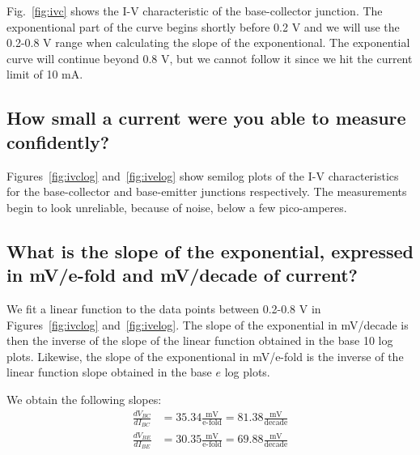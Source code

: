 Fig.~\ref{fig:ivc} shows the I-V characteristic of the base-collector junction. The exponentional part of the curve begins
shortly before 0.2 V and we will use the 0.2-0.8 V range when calculating the slope of the exponentional. The exponential
curve will continue beyond 0.8 V, but we cannot follow it since we hit the current limit of 10 mA.

\subsection{How small a current were you able to measure confidently?}
Figures~\ref{fig:ivclog} and~\ref{fig:ivelog} show semilog plots of the I-V characteristics for the base-collector and
base-emitter junctions respectively. The measurements begin to look unreliable, because of noise, below a few pico-amperes.

\subsection{What is the slope of the exponential, expressed in mV/e-fold and mV/decade of current?}
We fit a linear function to the data points between 0.2-0.8 V in Figures~\ref{fig:ivclog} and~\ref{fig:ivelog}. 
The slope of the exponential in mV/decade is then the inverse of the slope of the linear function obtained in 
the base 10 log plots. Likewise, the slope of the exponentional in mV/e-fold is the inverse of the linear function
slope obtained in the base \(e\) log plots.

We obtain the following slopes:
\begin{align*}
    \frac{dV_{BC}}{dI_{BC}} &= 35.34 \frac{\text{mV}}{\text{e-fold}} = 81.38 \frac{\text{mV}}{\text{decade}} \\
    \frac{dV_{BE}}{dI_{BE}} &= 30.35 \frac{\text{mV}}{\text{e-fold}} = 69.88 \frac{\text{mV}}{\text{decade}}
\end{align*}


